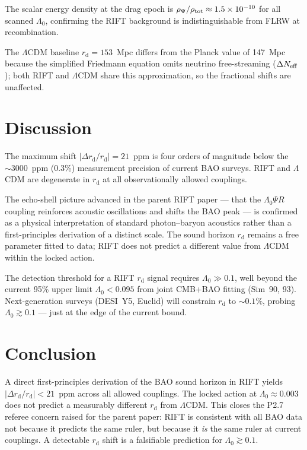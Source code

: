 \documentclass[12pt,a4paper]{article}
\newcommand{\rd}{r_{\mathrm{d}}}
\begin{document}
The scalar energy density at the drag epoch is
$\rho_\Psi/\rho_{\rm tot}\approx 1.5\times10^{-10}$ for all scanned
$\Lambda_0$, confirming the RIFT background is indistinguishable from
FLRW at recombination.

The $\Lambda$CDM baseline $\rd = 153$~Mpc differs from the Planck value
of 147~Mpc because the simplified Friedmann equation omits neutrino
free-streaming ($\Delta N_{\rm eff}$); both RIFT and $\Lambda$CDM share
this approximation, so the fractional shifts are unaffected.

\section{Discussion}

The maximum shift $|\Delta\rd/\rd| = 21$~ppm is four orders of magnitude
below the $\sim 3000$~ppm (0.3\%) measurement precision of current BAO
surveys.  RIFT and $\Lambda$CDM are degenerate in $\rd$ at all
observationally allowed couplings.

The echo-shell picture advanced in the parent RIFT paper --- that the
$\Lambda_0\Psi R$ coupling reinforces acoustic oscillations and shifts
the BAO peak --- is confirmed as a physical interpretation of standard
photon--baryon acoustics rather than a first-principles derivation
of a distinct scale.  The sound horizon $\rd$ remains a free parameter
fitted to data; RIFT does not predict a different value from $\Lambda$CDM
within the locked action.

The detection threshold for a RIFT $\rd$ signal requires
$\Lambda_0\gg 0.1$, well beyond the current 95\% upper limit
$\Lambda_0<0.095$ from joint CMB+BAO fitting (Sim~90, 93).
Next-generation surveys (DESI~Y5, Euclid) will constrain $\rd$ to
$\sim 0.1\%$, probing $\Lambda_0\gtrsim 0.1$ --- just at the edge of
the current bound.

\section{Conclusion}

A direct first-principles derivation of the BAO sound horizon in RIFT
yields $|\Delta\rd/\rd|<21$~ppm across all allowed couplings.
The locked action at $\Lambda_0\approx 0.003$ does not predict a
measurably different $\rd$ from $\Lambda$CDM.
This closes the P2.7 referee concern raised for the parent paper:
RIFT is consistent with all BAO data not because it predicts the
same ruler, but because it \emph{is} the same ruler at current couplings.
A detectable $\rd$ shift is a falsifiable prediction for
$\Lambda_0\gtrsim 0.1$.
\end{document}

